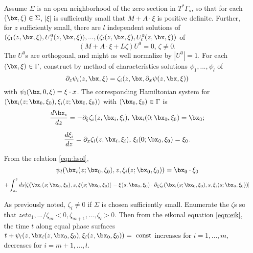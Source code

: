 Assume $\Sigma$ is an open neighborhood of the zero section in
$T^*\Gamma_s$, so that for each $(\bx,\xi) \in \Sigma$, $|\xi|$ is
sufficiently small that $M + A\cdot \xi$ is positive
definite. Further, for $z$ sufficiently small,
there are $l$ independent solutions of 
$(\zeta_1(z,\bx,\xi),U^0_1(z,\bx,\xi)),...,(\zeta_l(z,\bx,\xi), U^0_l(z,\bx,\xi))$ of
\begin{equation}
  \label{eqn:nullsp}
 (M + A\cdot \xi + L \zeta) U^0=0, \, \zeta\ne 0.
\end{equation}
The $U^0$s are orthogonal, and might as well normalize by
$|U^0|=1$. For each $(\bx,\xi) \in \Gamma$, construct by method of characteristics solutions
$\psi_1,...,\psi_l$ of 
\begin{equation}
  \label{eqn:eik}
\partial_z \psi_i(z,\bx,\xi) = \zeta_i(z,\bx,\partial_x\psi(z,\bx,\xi))
\end{equation}
with $\psi_l(\bx,0,\xi) =\xi \cdot x$. The corresponding Hamiltonian
system for $(\bx_i(z;\bx_0,\xi_0),\xi_i(z;\bx_0,\xi_0))$ with
$(\bx_0,\xi_0) \in \Gamma$ is
\begin{equation}
  \label{eqn:zetahe1}
  \frac{d\bx_i}{dz} = - \partial_{\xi}\zeta_i(z,\bx_i,\xi_i),\,
  \bx_i(0;\bx_0,\xi_0) = \bx_0;
\end{equation}

\begin{equation}
  \label{eqn:zetahe2}
  \frac{d\xi_i}{dz}
 = \partial_x\zeta_i(z,\bx_i,\xi_i),\, \xi_i(0;\bx_0,\xi_0) = \xi_0.
\end{equation}

From the relation \ref{eqn:hsol}, 
\[
  \psi_l(\bx_i(z;\bx_0,\xi_0),z,\xi_i(z;\bx_0,\xi_0))= \bx_0\cdot\xi_0 
\]
\begin{equation}
  \label{eqn:psihe}
+ \int_{z_s}^z ds [\zeta(\bx_i(s;\bx_0,\xi_0),s, \xi(s;\bx_0,\xi_0)) - \xi(s;\bx_0,\xi_0)\cdot \partial_{\xi}\zeta_i(\bx_i(s;\bx_0,\xi_0),s,\xi_i(s;\bx_0,\xi_0))]
\end{equation}

As previously noted, $\zeta_i \ne 0$ if $\Sigma$ is chosen
sufficiently small. Enumerate the $\zeta$s so that $zeta_1,.../\zeta_m
< 0, \zeta_{m+1},...,\zeta_l > 0$. Then from the eikonal equation
\ref{eqn:eik}, the time $t$ along equal phase surfaces $t +
\psi_i(z,\bx_i(z,\bx_0,\xi_0),\xi_i(z,\bx_0,\xi_0)) = \mbox{ const}$
increases for $i=1,...,m$, decreases for $i=m+1,...,l$.

